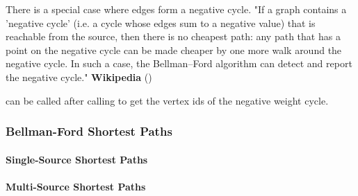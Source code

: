 There is a special case where edges form a negative cycle. 
"If a graph contains a 'negative cycle' (i.e. a cycle whose edges sum to a negative value) 
that is reachable from the source, then there is no cheapest path: any path that has a point 
on the negative cycle can be made cheaper by one more walk around the negative cycle. In such 
a case, the Bellman–Ford algorithm can detect and report the negative cycle." 
\textbf{Wikipedia} (\cite{REF_bellman})

 can be called after calling  to
get the vertex ids of the negative weight cycle.

\subsubsection{Bellman-Ford Shortest Paths}

\paragraph{Single-Source Shortest Paths}
{\small
      
}

\paragraph{Multi-Source Shortest Paths}
{\small
      
}

